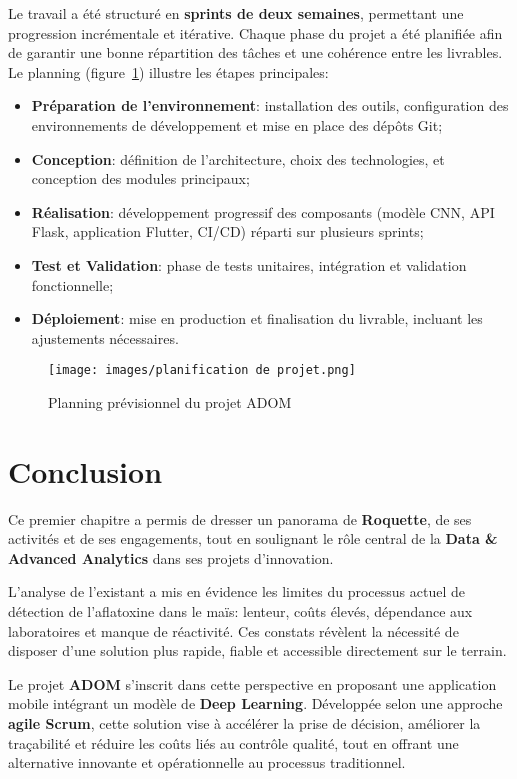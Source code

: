 \documentclass[12pt,a4paper]{report}
\begin{document}
Le travail a été structuré en \textbf{sprints de deux semaines}, permettant une progression incrémentale et itérative.
Chaque phase du projet a été planifiée afin de garantir une bonne répartition des tâches et une cohérence entre les livrables.
Le planning (figure~\ref{fig:planning}) illustre les étapes principales:

\begin{itemize}
    \item \textbf{Préparation de l’environnement}: installation des outils, configuration des environnements de développement et mise en place des dépôts Git;
    \item \textbf{Conception}: définition de l’architecture, choix des technologies, et conception des modules principaux;
    \item \textbf{Réalisation}: développement progressif des composants (modèle CNN, API Flask, application Flutter, CI/CD) réparti sur plusieurs sprints;
    \item \textbf{Test et Validation}: phase de tests unitaires, intégration et validation fonctionnelle;
    \item \textbf{Déploiement}: mise en production et finalisation du livrable, incluant les ajustements nécessaires.
\end{itemize}

\begin{figure}[H]
    \centering
    \texttt{[image: images/planification de projet.png]}
    \caption{Planning prévisionnel du projet ADOM}
    \label{fig:planning}
\end{figure}
\cleardoublepage
\section{Conclusion}

Ce premier chapitre a permis de dresser un panorama de \textbf{Roquette}, de ses activités et de ses engagements, tout en soulignant le rôle central de la \textbf{Data \& Advanced Analytics} dans ses projets d’innovation.

L’analyse de l’existant a mis en évidence les limites du processus actuel de détection de l’aflatoxine dans le maïs: lenteur, coûts élevés, dépendance aux laboratoires et manque de réactivité. Ces constats révèlent la nécessité de disposer d’une solution plus rapide, fiable et accessible directement sur le terrain.

Le projet \textbf{ADOM} s’inscrit dans cette perspective en proposant une application mobile intégrant un modèle de \textbf{Deep Learning}. Développée selon une approche \textbf{agile Scrum}, cette solution vise à accélérer la prise de décision, améliorer la traçabilité et réduire les coûts liés au contrôle qualité, tout en offrant une alternative innovante et opérationnelle au processus traditionnel.
\end{document}
